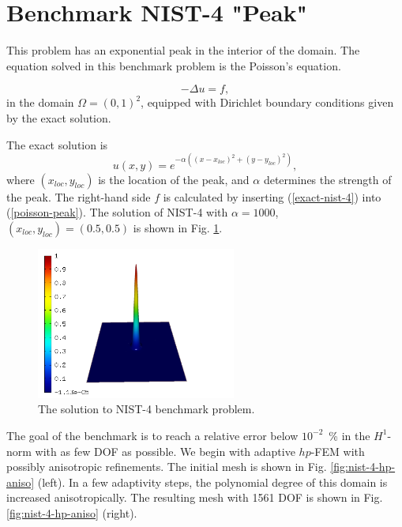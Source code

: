 \section{Benchmark NIST-4 "Peak"}
\label{sec:bench-4}

This problem has an exponential peak in the interior of the domain.
The equation solved in this benchmark problem is the Poisson's equation.

\begin{equation} \label{poisson-peak}
-\Delta u = f,
\end{equation}
in the domain $\Omega = (0, 1)^2$, equipped with Dirichlet
boundary conditions given by the exact solution.

The exact solution is 
\begin{equation}\label{exact-nist-4}
u(x,y) = e^{-\alpha ((x - x_{loc})^{2} + (y - y_{loc})^{2})},
\end{equation}
where $(x_{loc}, y_{loc})$ is the location of the peak, and $\alpha$ determines the strength of the peak.
The right-hand side $f$ is calculated by inserting (\ref{exact-nist-4}) into (\ref{poisson-peak}).
The solution of NIST-4 with $\alpha = 1000$, $(x_{loc}, y_{loc}) = (0.5, 0.5)$ is shown in Fig. \ref{fig:sln-nist04}.

\begin{figure}[!ht]
\centering
\includegraphics[height=5cm]{nist/nist-4/solution.png}
\caption{The solution to NIST-4 benchmark problem.}
\label{fig:sln-nist04}
\end{figure}

The goal of the benchmark is to reach a relative error below
$10^{-2}$~\% in the $H^1$-norm with as few DOF 
as possible.
We begin with adaptive $hp$-FEM with possibly anisotropic refinements.
The initial mesh is shown in Fig. \ref{fig:nist-4-hp-aniso} (left).
In a few adaptivity steps, the polynomial degree of this domain is increased
anisotropically.
The resulting mesh with 1561 DOF is shown in Fig. \ref{fig:nist-4-hp-aniso} (right).

